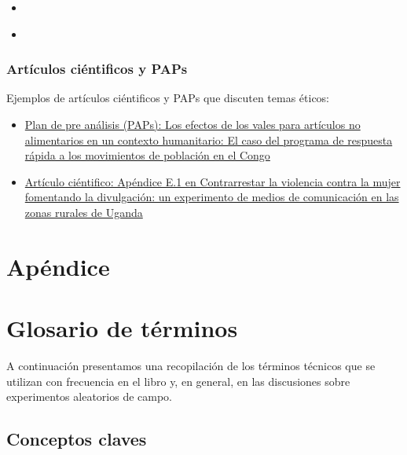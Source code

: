 \documentclass[
  12pt,
  spanish,
]{book}
\begin{document}
\begin{itemize}
\item
  \autocite{Asieduetal2021ethics}
\item
  \autocite{Evans2021ethics}
\end{itemize}

\hypertarget{artuxedculos-ciuxe9ntificos-y-paps}{%
\subsection{Artículos ciéntificos y PAPs}\label{artuxedculos-ciuxe9ntificos-y-paps}}

Ejemplos de artículos ciéntificos y PAPs que discuten temas éticos:

\begin{itemize}
\item
  \href{https://osf.io/eutx7/}{Plan de pre análisis (PAPs): Los efectos de los vales para artículos no alimentarios en un contexto humanitario: El caso del programa de respuesta rápida a los movimientos de población en el Congo}
\item
  \href{http://jasper-cooper.com/papers/Green_et_al.pdf}{Artículo ciéntifico: Apéndice E.1 en Contrarrestar la violencia contra la mujer fomentando la divulgación: un experimento de medios de comunicación en las zonas rurales de Uganda}
\end{itemize}

\cleardoublepage

\hypertarget{apuxe9ndice}{%
\chapter*{Apéndice}\label{apuxe9ndice}}

\hypertarget{glosario-de-tuxe9rminos}{%
\chapter{Glosario de términos}\label{glosario-de-tuxe9rminos}}

A continuación presentamos una recopilación de los términos técnicos que se utilizan con frecuencia en el libro y, en general, en las discusiones sobre experimentos aleatorios de campo.

\hypertarget{conceptos-claves}{%
\section{Conceptos claves}\label{conceptos-claves}}
\end{document}
